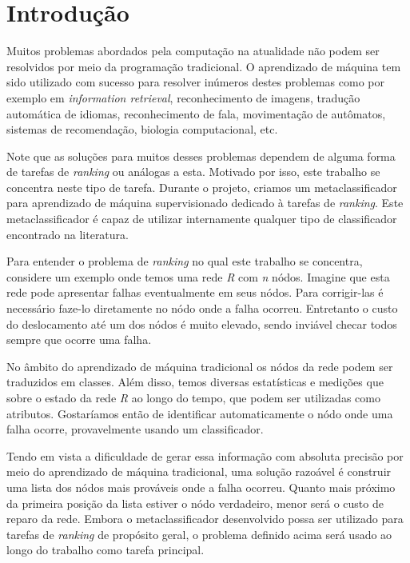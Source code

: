 \chapter{Introdução}

Muitos problemas abordados pela computação na atualidade não podem ser resolvidos por meio da programação tradicional.
O aprendizado de máquina tem sido utilizado com sucesso para resolver inúmeros destes problemas como por exemplo em \textit{information retrieval}, reconhecimento de imagens, tradução automática de idiomas, reconhecimento de fala, movimentação de autômatos, sistemas de recomendação, biologia computacional, etc.

Note que as soluções para muitos desses problemas dependem de alguma forma de tarefas de \textit{ranking} ou análogas a esta.
Motivado por isso, este trabalho se concentra neste tipo de tarefa.
Durante o projeto, criamos um metaclassificador para aprendizado de máquina supervisionado dedicado à tarefas de \textit{ranking}.
Este metaclassificador é capaz de utilizar internamente qualquer tipo de classificador encontrado na literatura.

Para entender o problema de \textit{ranking} no qual este trabalho se concentra, considere um exemplo onde temos uma rede \textit{R} com \textit{n} nódos.
Imagine que esta rede pode apresentar falhas eventualmente em seus nódos.
Para corrigir-las é necessário faze-lo diretamente no nódo onde a falha ocorreu.
Entretanto o custo do deslocamento até um dos nódos é muito elevado, sendo inviável checar todos sempre que ocorre uma falha.

No âmbito do aprendizado de máquina tradicional os nódos da rede podem ser traduzidos em classes.
Além disso, temos diversas estatísticas e medições que sobre o estado da rede \textit{R} ao longo do tempo, que podem ser utilizadas como atributos.
Gostaríamos então de identificar automaticamente o nódo onde uma falha ocorre, provavelmente usando um classificador.

Tendo em vista a dificuldade de gerar essa informação com absoluta precisão por meio do aprendizado de máquina tradicional, uma solução razoável é construir uma lista dos nódos mais prováveis onde a falha ocorreu.
Quanto mais próximo da primeira posição da lista estiver o nódo verdadeiro, menor será o custo de reparo da rede.
Embora o metaclassificador desenvolvido possa ser utilizado para tarefas de \textit{ranking} de propósito geral, o problema definido acima será usado ao longo do trabalho como tarefa principal.

